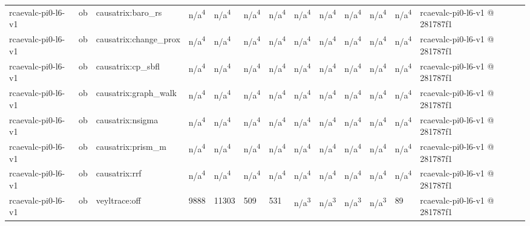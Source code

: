 \begin{table}[t]
\begin{tabular}{lllllllllllll}
rcaevalc-pi0-l6-v1 & ob & causatrix:baro\_rs & n/a\textsuperscript{4} & n/a\textsuperscript{4} & n/a\textsuperscript{4} & n/a\textsuperscript{4} & n/a\textsuperscript{4} & n/a\textsuperscript{4} & n/a\textsuperscript{4} & n/a\textsuperscript{4} & n/a\textsuperscript{4} & rcaevalc-pi0-l6-v1 @ 281787f1 \\
rcaevalc-pi0-l6-v1 & ob & causatrix:change\_prox & n/a\textsuperscript{4} & n/a\textsuperscript{4} & n/a\textsuperscript{4} & n/a\textsuperscript{4} & n/a\textsuperscript{4} & n/a\textsuperscript{4} & n/a\textsuperscript{4} & n/a\textsuperscript{4} & n/a\textsuperscript{4} & rcaevalc-pi0-l6-v1 @ 281787f1 \\
rcaevalc-pi0-l6-v1 & ob & causatrix:cp\_sbfl & n/a\textsuperscript{4} & n/a\textsuperscript{4} & n/a\textsuperscript{4} & n/a\textsuperscript{4} & n/a\textsuperscript{4} & n/a\textsuperscript{4} & n/a\textsuperscript{4} & n/a\textsuperscript{4} & n/a\textsuperscript{4} & rcaevalc-pi0-l6-v1 @ 281787f1 \\
rcaevalc-pi0-l6-v1 & ob & causatrix:graph\_walk & n/a\textsuperscript{4} & n/a\textsuperscript{4} & n/a\textsuperscript{4} & n/a\textsuperscript{4} & n/a\textsuperscript{4} & n/a\textsuperscript{4} & n/a\textsuperscript{4} & n/a\textsuperscript{4} & n/a\textsuperscript{4} & rcaevalc-pi0-l6-v1 @ 281787f1 \\
rcaevalc-pi0-l6-v1 & ob & causatrix:nsigma & n/a\textsuperscript{4} & n/a\textsuperscript{4} & n/a\textsuperscript{4} & n/a\textsuperscript{4} & n/a\textsuperscript{4} & n/a\textsuperscript{4} & n/a\textsuperscript{4} & n/a\textsuperscript{4} & n/a\textsuperscript{4} & rcaevalc-pi0-l6-v1 @ 281787f1 \\
rcaevalc-pi0-l6-v1 & ob & causatrix:prism\_m & n/a\textsuperscript{4} & n/a\textsuperscript{4} & n/a\textsuperscript{4} & n/a\textsuperscript{4} & n/a\textsuperscript{4} & n/a\textsuperscript{4} & n/a\textsuperscript{4} & n/a\textsuperscript{4} & n/a\textsuperscript{4} & rcaevalc-pi0-l6-v1 @ 281787f1 \\
rcaevalc-pi0-l6-v1 & ob & causatrix:rrf & n/a\textsuperscript{4} & n/a\textsuperscript{4} & n/a\textsuperscript{4} & n/a\textsuperscript{4} & n/a\textsuperscript{4} & n/a\textsuperscript{4} & n/a\textsuperscript{4} & n/a\textsuperscript{4} & n/a\textsuperscript{4} & rcaevalc-pi0-l6-v1 @ 281787f1 \\
rcaevalc-pi0-l6-v1 & ob & veyltrace:off & 9888 & 11303 & 509 & 531 & n/a\textsuperscript{3} & n/a\textsuperscript{3} & n/a\textsuperscript{3} & n/a\textsuperscript{3} & 89 & rcaevalc-pi0-l6-v1 @ 281787f1 \\

\end{tabular}
\end{table}
